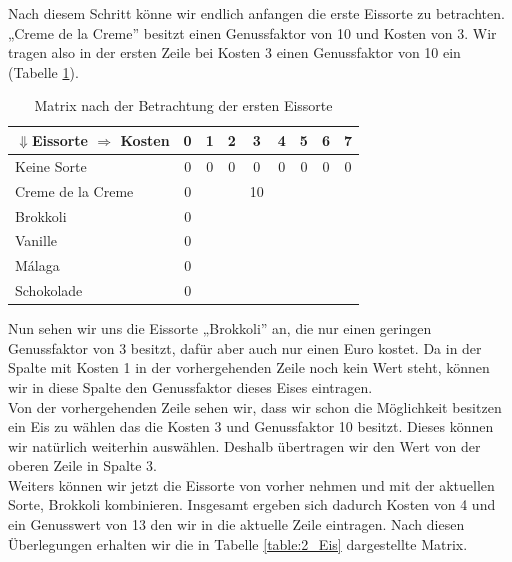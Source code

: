 \documentclass[a4paper, 12pt]{article}
\begin{document}
Nach diesem Schritt könne wir endlich anfangen die erste Eissorte zu betrachten. „Creme de la Creme” besitzt einen Genussfaktor von 10 und Kosten von 3. Wir tragen also in der ersten Zeile bei Kosten 3 einen Genussfaktor von 10 ein (Tabelle \ref{table:1_Eis}).

\begin{table}[H]
	\begin{center}
		\begin{tabular}{l|cccccccc}
			$\Downarrow$Eissorte $\Rightarrow$ Kosten & 0 & 1 & 2 & 3 & 4 & 5 &
			6 & 7\\
			\hline
			Keine Sorte			& 0 & 0 & 0 & 0	 & 0	& 0 & 0 & 0 \\
			Creme de la Creme	& 0 &	&	& 10 &	&	&	&	\\
			Brokkoli			& 0 &	&	&	 &	&	&	&	\\
			Vanille				& 0 &	&	&	 &	&	&	&	\\
			Málaga				& 0 &	&	&	 &	&	&	&	\\
			Schokolade			& 0 &	&	&	 &	&	&	&	\\
		\end{tabular}
	\end{center}
\caption{Matrix nach der Betrachtung der ersten Eissorte}
\label{table:1_Eis}
\end{table}

Nun sehen wir uns die Eissorte „Brokkoli” an, die nur einen geringen Genussfaktor von 3 besitzt, dafür aber auch nur einen Euro kostet. Da in der Spalte mit Kosten 1 in der vorhergehenden Zeile noch kein Wert steht, können wir in diese Spalte den Genussfaktor dieses Eises eintragen.\\

Von der vorhergehenden Zeile sehen wir, dass wir schon die Möglichkeit besitzen ein Eis zu wählen das die Kosten 3 und Genussfaktor 10 besitzt. Dieses können wir natürlich weiterhin auswählen. Deshalb übertragen wir den Wert von der oberen Zeile in Spalte 3.\\

Weiters können wir jetzt die Eissorte von vorher nehmen und mit der aktuellen Sorte, Brokkoli kombinieren. Insgesamt ergeben sich dadurch Kosten von 4 und ein Genusswert von 13 den wir in die aktuelle Zeile eintragen. Nach diesen Überlegungen erhalten wir die in Tabelle \ref{table:2_Eis} dargestellte Matrix.
\end{document}
